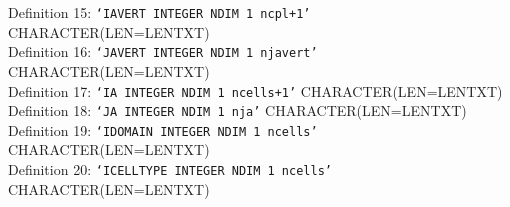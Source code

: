 \noindent Definition 15: \texttt{`IAVERT INTEGER NDIM 1 ncpl+1'} {\color{red} \footnotesize{CHARACTER(LEN=LENTXT)}} \\
\noindent Definition 16: \texttt{`JAVERT INTEGER NDIM 1 njavert'} {\color{red} \footnotesize{CHARACTER(LEN=LENTXT)}} \\
\noindent Definition 17: \texttt{`IA INTEGER NDIM 1 ncells+1'} {\color{red} \footnotesize{CHARACTER(LEN=LENTXT)}} \\
\noindent Definition 18: \texttt{`JA INTEGER NDIM 1 nja'} {\color{red} \footnotesize{CHARACTER(LEN=LENTXT)}} \\
\noindent Definition 19: \texttt{`IDOMAIN INTEGER NDIM 1 ncells'} {\color{red} \footnotesize{CHARACTER(LEN=LENTXT)}} \\
\noindent Definition 20: \texttt{`ICELLTYPE INTEGER NDIM 1 ncells'} {\color{red} \footnotesize{CHARACTER(LEN=LENTXT)}} \\

